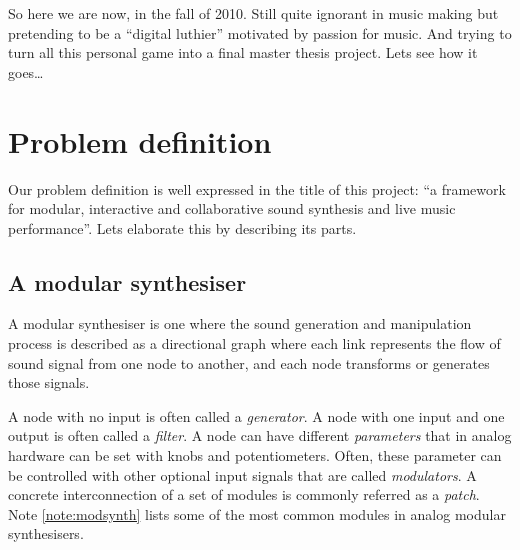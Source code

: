So here we are now, in the fall of 2010. Still quite ignorant in music
making but pretending to be a ``digital luthier'' motivated by passion
for music. And trying to turn all this personal game into a final
master thesis project. Lets see how it goes\ldots


\section{Problem definition}

Our problem definition is well expressed in the title of this project:
``a framework for modular, interactive and collaborative sound
synthesis and live music performance''. Lets elaborate this by
describing its parts.

\subsection{A modular synthesiser}
\label{sec:defmodular}
A modular synthesiser is one where the sound generation and
manipulation process is described as a directional graph where each
link represents the flow of sound signal from one node to another, and
each node transforms or generates those signals.

A node with no input is often called a \emph{generator}. A node with
one input and one output is often called a \emph{filter}. A node can
have different \emph{parameters} that in analog hardware can be set
with knobs and potentiometers. Often, these parameter can be
controlled with other optional input signals that are called
\emph{modulators}. A concrete interconnection of a set of modules is
commonly referred as a \emph{patch}. Note \ref{note:modsynth} lists
some of the most common modules in analog modular synthesisers.

